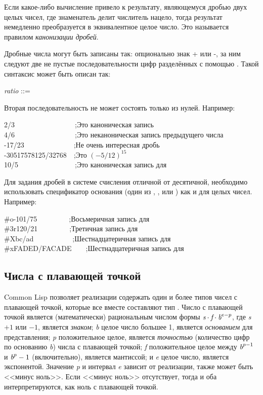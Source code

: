 Если какое-либо вычисление привело к результату, являющемуся
дробью двух целых чисел, где знаменатель делит числитель нацело,
тогда результат немедленно преобразуется в эквивалентное целое
число. Это называется правилом \emph{канонизации дробей}.

Дробные числа могут быть записаны так: опционально знак + или -,
за ним следуют две не пустые последовательности цифр разделённых с
помощью \cd{/} . Такой синтаксис может быть описан так:

\begin{tabbing}
\emph{ratio} ::=   \cd{/} 
\end{tabbing}

Вторая последовательность не может состоять только из
нулей. Например:  
\begin{lisp}
2/3~~~~~~~~~~~~~~~~~;\textrm{Это каноническая запись} \\
4/6~~~~~~~~~~~~~~~~~;\textrm{Это неканоническая запись предыдущего числа} \\
-17/23~~~~~~~~~~~~~~;\textrm{Не очень интересная дробь} \\
-30517578125/32768~~;\textrm{Это $(-5/12)^{15}$} \\
10/5~~~~~~~~~~~~~~~~;\textrm{Это каноническая запись для }
\end{lisp}

Для задания дробей в системе счисления отличной от десятичной, необходимо
использовать спецификатор основания (один из , ,  или ) как и для
целых чисел. Например:

\begin{lisp}
\#o-101/75~~~~~~~~~;\textrm{Восьмеричная запись для } \\
\#3r120/21~~~~~~~~~;\textrm{Третичная запись для } \\
\#Xbc/ad~~~~~~~~~~~;\textrm{Шестнадцатеричная запись для } \\
\#xFADED/FACADE~~~~;\textrm{Шестнадцатеричная запись для } 
\end{lisp}

\subsection{Числа с плавающей точкой}

Common Lisp позволяет реализации содержать один и более типов чисел с
плавающей точкой, которые все вместе составляют тип .
Число с плавающей точкой является (математически) рациональным числом формы
$\emph{s} \cdot \emph{f} \cdot \emph{b}^{e-p}$,
где \emph{s} $+1$ или $-1$, является \emph{знаком};
\emph{b} целое число большее 1,
является \emph{основанием} для представления;
\emph{p} положительное целое, является \emph{точностью} (количество цифр по
основанию \emph{b}) числа с плавающей точкой;
\emph{f} положительное целое между $\emph{b}^{p-1}$ и
$\emph{b}^{p}-1$ (включительно), является мантиссой;
и \emph{e} целое число, является экспонентой.
Значение \emph{p} и интервал \emph{e} зависит от реализации, также может быть
<<минус ноль>>. Если <<минус ноль>> отсутствует, тогда  и  оба
интерпретируются, как ноль с плавающей точкой.

